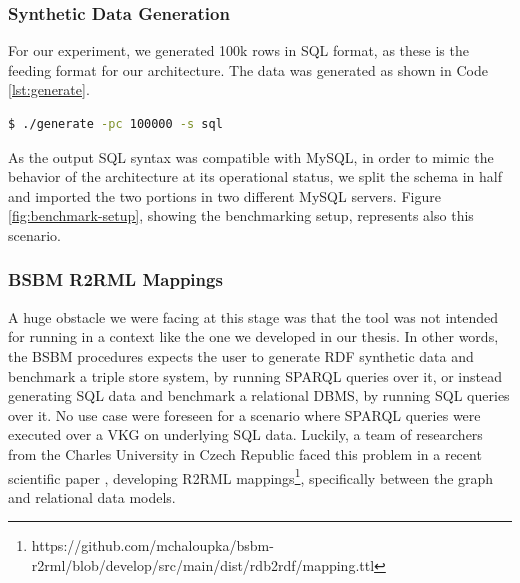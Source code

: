 \subsubsection{Synthetic Data Generation}
For our experiment, we generated 100k rows in SQL format, as these is the feeding format for our architecture. The data was generated as shown in Code \ref{lst:generate}.
\begin{lstlisting}[language=bash, caption={BSBM generator script that invokes Generator class and JAR executor}, label={lst:generate}]
    $ ./generate -pc 100000 -s sql
\end{lstlisting}
As the output SQL syntax was compatible with MySQL, in order to mimic the behavior of the architecture at its operational status, we split the schema in half and imported the two portions in two different MySQL servers. Figure \ref{fig:benchmark-setup}, showing the benchmarking setup, represents also this scenario.

\subsubsection{BSBM R2RML Mappings}
A huge obstacle we were facing at this stage was that the tool was not intended for running in a context like the one we developed in our thesis. In other words, the BSBM procedures expects the user to generate RDF synthetic data and benchmark a triple store system, by running SPARQL queries over it, or instead generating SQL data and benchmark a relational DBMS, by running SQL queries over it. No use case were foreseen for a scenario where SPARQL queries were executed over a VKG on underlying SQL data.
Luckily, a team of researchers from the Charles University in Czech Republic faced this problem in a recent scientific paper \cite{DBLP:journals/dke/ChaloupkaN24}, developing R2RML mappings\footnote{https://github.com/mchaloupka/bsbm-r2rml/blob/develop/src/main/dist/rdb2rdf/mapping.ttl}, specifically between the graph and relational data models.

